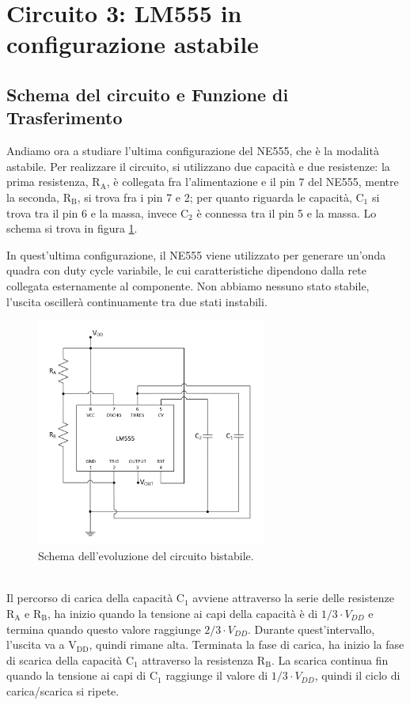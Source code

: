 \documentclass{report}
\begin{document}
\newpage
\section{Circuito 3: LM555 in configurazione astabile}
\subsection{Schema del circuito e Funzione di Trasferimento}
Andiamo ora a studiare l'ultima configurazione del NE555, che è la modalità astabile. Per realizzare il circuito, si utilizzano due capacità e due resistenze: la prima resistenza, $\mathrm{R_A}$, è collegata fra l'alimentazione e il pin 7 del NE555, mentre la seconda, $\mathrm{R_B}$, si trova fra i pin 7 e 2; per quanto riguarda le capacità, $\mathrm{C_1}$ si trova tra il pin 6 e la massa, invece $\mathrm{C_2}$ è connessa tra il pin 5 e la massa. Lo schema si trova in figura \ref{figura:schema3}. \par
In quest'ultima configurazione, il NE555 viene utilizzato per generare un'onda quadra con duty cycle variabile, le cui caratteristiche dipendono dalla rete collegata esternamente al componente. Non abbiamo nessuno stato stabile, l'uscita oscillerà continuamente tra due stati instabili.
\begin{figure}[h!]
	\centering
	\includegraphics[height=7.5cm]{immagini/schema3}
	\caption{Schema dell'evoluzione del circuito bistabile.}
	\label{figura:schema3}
\end{figure}
\\Il percorso di carica della capacità $\mathrm{C_1}$ avviene attraverso la serie delle resistenze $\mathrm{R_A}$ e $\mathrm{R_B}$, ha inizio quando la tensione ai capi della capacità è di $1/3\cdot V_{DD}$ e termina quando questo valore raggiunge $2/3\cdot V_{DD}$. Durante quest'intervallo, l'uscita va a $\mathrm{V_{DD}}$, quindi rimane alta. Terminata la fase di carica, ha inizio la fase di scarica della capacità $\mathrm{C_1}$ attraverso la resistenza $\mathrm{R_B}$. La scarica continua fin quando la tensione ai capi di $\mathrm{C_1}$ raggiunge il valore di $1/3\cdot V_{DD}$, quindi il ciclo di carica/scarica si ripete. 
\end{document}
